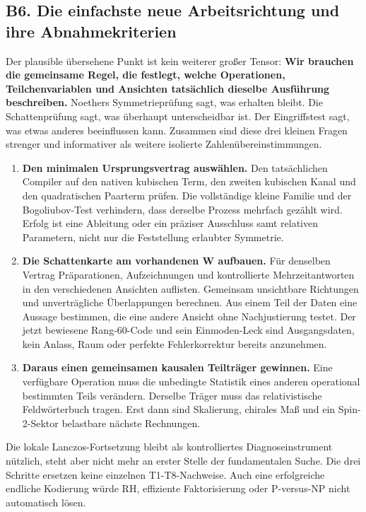 \subsection{B6. Die einfachste neue Arbeitsrichtung und ihre
Abnahmekriterien}\label{b6.-die-einfachste-neue-arbeitsrichtung-und-ihre-abnahmekriterien}

Der plausible übersehene Punkt ist kein weiterer großer Tensor:
\textbf{Wir brauchen die gemeinsame Regel, die festlegt, welche
Operationen, Teilchenvariablen und Ansichten tatsächlich dieselbe
Ausführung beschreiben.} Noethers Symmetrieprüfung sagt, was erhalten
bleibt. Die Schattenprüfung sagt, was überhaupt unterscheidbar ist. Der
Eingriffstest sagt, was etwas anderes beeinflussen kann. Zusammen sind
diese drei kleinen Fragen strenger und informativer als weitere
isolierte Zahlenübereinstimmungen.

\begin{enumerate}
\def\labelenumi{\arabic{enumi}.}
\tightlist
\item
  \textbf{Den minimalen Ursprungsvertrag auswählen.} Den tatsächlichen
  Compiler auf den nativen kubischen Term, den zweiten kubischen Kanal
  und den quadratischen Paarterm prüfen. Die vollständige kleine Familie
  und der Bogoliubov-Test verhindern, dass derselbe Prozess mehrfach
  gezählt wird. Erfolg ist eine Ableitung oder ein präziser Ausschluss
  samt relativen Parametern, nicht nur die Feststellung erlaubter
  Symmetrie.
\item
  \textbf{Die Schattenkarte am vorhandenen W aufbauen.} Für denselben
  Vertrag Präparationen, Aufzeichnungen und kontrollierte
  Mehrzeitantworten in den verschiedenen Ansichten auflisten. Gemeinsam
  unsichtbare Richtungen und unverträgliche Überlappungen berechnen. Aus
  einem Teil der Daten eine Aussage bestimmen, die eine andere Ansicht
  ohne Nachjustierung testet. Der jetzt bewiesene Rang-60-Code und sein
  Einmoden-Leck sind Ausgangsdaten, kein Anlass, Raum oder perfekte
  Fehlerkorrektur bereits anzunehmen.
\item
  \textbf{Daraus einen gemeinsamen kausalen Teilträger gewinnen.} Eine
  verfügbare Operation muss die unbedingte Statistik eines anderen
  operational bestimmten Teils verändern. Derselbe Träger muss das
  relativistische Feldwörterbuch tragen. Erst dann sind Skalierung,
  chirales Maß und ein Spin-2-Sektor belastbare nächste Rechnungen.
\end{enumerate}

Die lokale Lanczos-Fortsetzung bleibt als kontrolliertes
Diagnoseinstrument nützlich, steht aber nicht mehr an erster Stelle der
fundamentalen Suche. Die drei Schritte ersetzen keine einzelnen
T1-T8-Nachweise. Auch eine erfolgreiche endliche Kodierung würde RH,
effiziente Faktorisierung oder P-versus-NP nicht automatisch lösen.

